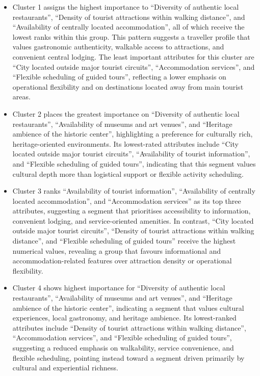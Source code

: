 \documentclass[a4paper, 12pt, twoside]{report}  %
\begin{document}
\begin{itemize}
\item Cluster 1 assigns the highest importance to “Diversity of authentic local restaurants”, “Density of tourist attractions within walking distance”, and “Availability of centrally located accommodation”, all of which receive the lowest ranks within this group. This pattern suggests a traveller profile that values gastronomic authenticity, walkable access to attractions, and convenient central lodging. The least important attributes for this cluster are “City located outside major tourist circuits”, “Accommodation services”, and “Flexible scheduling of guided tours”, reflecting a lower emphasis on operational flexibility and on destinations located away from main tourist areas.
\item Cluster 2 places the greatest importance on “Diversity of authentic local restaurants”, “Availability of museums and art venues”, and “Heritage ambience of the historic center”, highlighting a preference for culturally rich, heritage-oriented environments. Its lowest-rated attributes include “City located outside major tourist circuits”, “Availability of tourist information”, and “Flexible scheduling of guided tours”, indicating that this segment values cultural depth more than logistical support or flexible activity scheduling.
\item Cluster 3 ranks “Availability of tourist information”, “Availability of centrally located accommodation”, and “Accommodation services” as its top three attributes, suggesting a segment that prioritises accessibility to information, convenient lodging, and service-oriented amenities. In contrast, “City located outside major tourist circuits”, “Density of tourist attractions within walking distance”, and “Flexible scheduling of guided tours” receive the highest numerical values, revealing a group that favours informational and accommodation-related features over attraction density or operational flexibility.
\item Cluster 4 shows highest importance for “Diversity of authentic local restaurants”, “Availability of museums and art venues”, and “Heritage ambience of the historic center”, indicating a segment that values cultural experiences, local gastronomy, and heritage ambience. Its lowest-ranked attributes include “Density of tourist attractions within walking distance”, “Accommodation services”, and “Flexible scheduling of guided tours”, suggesting a reduced emphasis on walkability, service convenience, and flexible scheduling, pointing instead toward a segment driven primarily by cultural and experiential richness.
\end{itemize}
\end{document}
